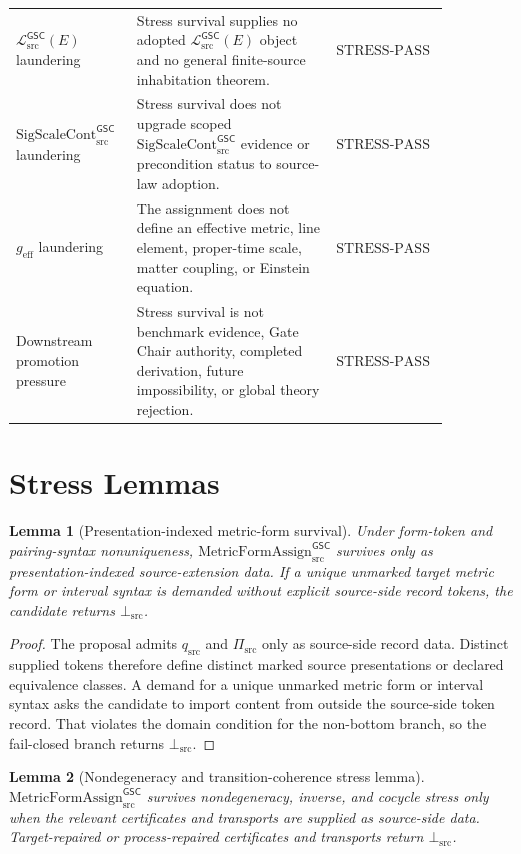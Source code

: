 \documentclass[11pt]{article}
\newcommand{\MetricData}{\mathcal{L}_{\mathrm{src}}^{\mathsf{GSC}}}
\newcommand{\geff}{g_{\mathrm{eff}}}
\newcommand{\SigScaleCont}{\mathrm{SigScaleCont}_{\mathrm{src}}^{\mathsf{GSC}}}
\newcommand{\MetricFormAssign}{\mathrm{MetricFormAssign}_{\mathrm{src}}^{\mathsf{GSC}}}
\newcommand{\FormTok}{q_{\mathrm{src}}}
\newcommand{\PairTok}{\Pi_{\mathrm{src}}}
\newcommand{\BottomSrc}{\bot_{\mathrm{src}}}
\newcommand{\StressPass}{\mathrm{STRESS\mbox{-}PASS}}
\newtheorem{lemma}{Lemma}
\begin{document}
\begin{longtable}{p{0.25\linewidth}p{0.43\linewidth}p{0.18\linewidth}}
\(\MetricData(E)\) laundering & Stress survival supplies no adopted
\(\MetricData(E)\) object and no general finite-source inhabitation theorem. &
\(\StressPass\) \\
\(\SigScaleCont\) laundering & Stress survival does not upgrade scoped
\(\SigScaleCont\) evidence or precondition status to source-law adoption. &
\(\StressPass\) \\
\(\geff\) laundering & The assignment does not define an effective metric,
line element, proper-time scale, matter coupling, or Einstein equation. &
\(\StressPass\) \\
Downstream promotion pressure & Stress survival is not benchmark evidence,
Gate Chair authority, completed derivation, future impossibility, or global
theory rejection. & \(\StressPass\) \\
\bottomrule
\end{longtable}

\section{Stress Lemmas}

\begin{lemma}[Presentation-indexed metric-form survival]
Under form-token and pairing-syntax nonuniqueness, \(\MetricFormAssign\)
survives only as presentation-indexed source-extension data. If a unique
unmarked target metric form or interval syntax is demanded without explicit
source-side record tokens, the candidate returns \(\BottomSrc\).
\end{lemma}

\begin{proof}
The proposal admits \(\FormTok\) and \(\PairTok\) only as source-side record
data. Distinct supplied tokens therefore define distinct marked source
presentations or declared equivalence classes. A demand for a unique unmarked
metric form or interval syntax asks the candidate to import content from
outside the source-side token record. That violates the domain condition for
the non-bottom branch, so the fail-closed branch returns \(\BottomSrc\).
\end{proof}

\begin{lemma}[Nondegeneracy and transition-coherence stress lemma]
\(\MetricFormAssign\) survives nondegeneracy, inverse, and cocycle stress only
when the relevant certificates and transports are supplied as source-side
data. Target-repaired or process-repaired certificates and transports return
\(\BottomSrc\).
\end{lemma}
\end{document}
